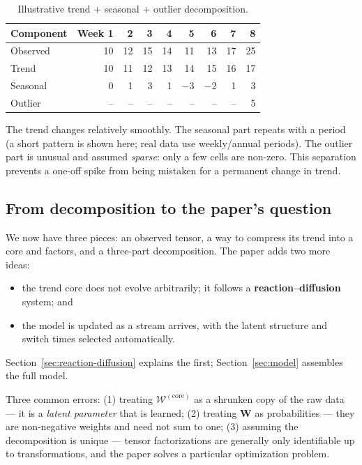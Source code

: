 \begin{table}[htbp]
  \centering
  \small
  \caption{Illustrative trend + seasonal + outlier decomposition.}
  \label{tab:three-components}
  \begin{tabular}{lrrrrrrrr}
    \toprule
    Component & Week 1 & 2 & 3 & 4 & 5 & 6 & 7 & 8 \\
    \midrule
    Observed  & 10 & 12 & 15 & 14 & 11 & 13 & 17 & 25 \\
    Trend     & 10 & 11 & 12 & 13 & 14 & 15 & 16 & 17 \\
    Seasonal  &  0 &  1 &  3 &  1 & $-3$ & $-2$ &  1 &  3 \\
    Outlier   &  -- & -- & -- & -- & -- & -- & -- &  5 \\
    \bottomrule
  \end{tabular}
\end{table}

The trend changes relatively smoothly. The seasonal part repeats with a period (a short pattern is
shown here; real data use weekly/annual periods). The outlier part is unusual and assumed
\emph{sparse}: only a few cells are non-zero. This separation prevents a one-off spike from being
mistaken for a permanent change in trend.

\subsection{From decomposition to the paper's question}

We now have three pieces: an observed tensor, a way to compress its trend into a core and factors,
and a three-part decomposition. The paper adds two more ideas:
\begin{itemize}
  \item the trend core does not evolve arbitrarily; it follows a \textbf{reaction--diffusion} system; and
  \item the model is updated as a stream arrives, with the latent structure and switch times selected
        automatically.
\end{itemize}
Section~\ref{sec:reaction-diffusion} explains the first; Section~\ref{sec:model} assembles the full model.

\begin{commonmistake}
Three common errors: (1) treating $\mathcal{W}^{(\mathrm{core})}$ as a shrunken copy of the raw data ---
it is a \emph{latent parameter} that is learned; (2) treating $\mathbf{W}$ as probabilities --- they
are non-negative weights and need not sum to one; (3) assuming the decomposition is unique --- tensor
factorizations are generally only identifiable up to transformations, and the paper solves a
particular optimization problem.
\end{commonmistake}


